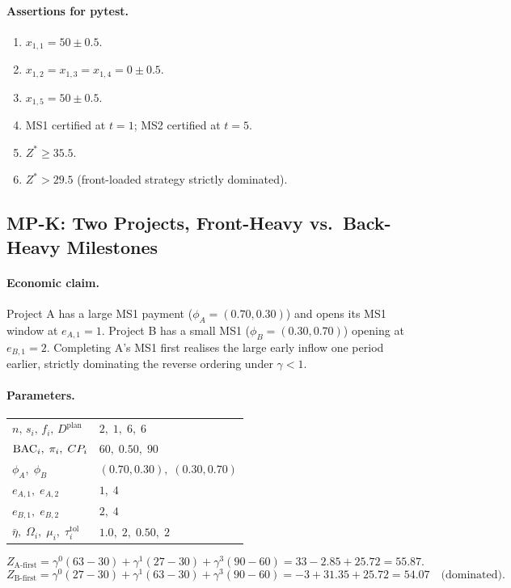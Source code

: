 \paragraph{Assertions for pytest.}
\begin{enumerate}[label=A\arabic*.]
  \item $x_{1,1}=50\pm0.5$.
  \item $x_{1,2}=x_{1,3}=x_{1,4}=0\pm0.5$.
  \item $x_{1,5}=50\pm0.5$.
  \item MS1 certified at $t=1$; MS2 certified at $t=5$.
  \item $Z^*\geq35.5$.
  \item $Z^*>29.5$ (front-loaded strategy strictly dominated).
\end{enumerate}

\subsection{MP-K: Two Projects, Front-Heavy vs.\ Back-Heavy Milestones}

\paragraph{Economic claim.}
Project A has a large MS1 payment ($\phi_A=(0.70,0.30)$) and opens
its MS1 window at $e_{A,1}=1$. Project B has a small MS1
($\phi_B=(0.30,0.70)$) opening at $e_{B,1}=2$. Completing A's MS1
first realises the large early inflow one period earlier, strictly
dominating the reverse ordering under $\gamma<1$.

\paragraph{Parameters.}
\begin{center}
\begin{tabular}{ll}
\toprule
$n,\,s_i,\,f_i,\,D^{\mathrm{plan}}$ & $2,\;1,\;6,\;6$\\
$\mathrm{BAC}_i,\;\pi_i,\;CP_i$ & $60,\;0.50,\;90$\\
$\phi_A,\;\phi_B$ & $(0.70,0.30),\;(0.30,0.70)$\\
$e_{A,1},\;e_{A,2}$ & $1,\;4$\\
$e_{B,1},\;e_{B,2}$ & $2,\;4$\\
$\bar\eta,\;\Omega_i,\;\mu_i,\;\tau_i^{\mathrm{tol}}$ & $1.0,\;2,\;0.50,\;2$\\
\bottomrule
\end{tabular}
\end{center}
\[
  Z_{\mathrm{A\text{-}first}}
    = \gamma^0(63-30)+\gamma^1(27-30)+\gamma^3(90-60)
    = 33-2.85+25.72 = \mathbf{55.87}.
\]
\[
  Z_{\mathrm{B\text{-}first}}
    = \gamma^0(27-30)+\gamma^1(63-30)+\gamma^3(90-60)
    = -3+31.35+25.72 = 54.07\quad\text{(dominated)}.
\]

